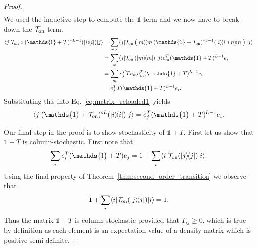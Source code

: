 \documentclass{article}
\newcommand{\on}{\rm on}
\newcommand{\ket}[1]{|#1\rangle}
\newcommand{\bra}[1]{\langle #1|}
\newcommand{\ketbra}[2]{| #1\rangle\! \langle #2|}
\newcommand{\brackets}[1]{\left[ #1 \right]}
\DeclareMathOperator{\Tr}{Tr}
\newcommand{\trace}[1]{\Tr \brackets{ #1 }}
\newcommand{\identity}{\mathds{1}}
\begin{document}
\begin{proof}
\begin{align}
\end{align}
We used the inductive step to compute the $\identity$ term and we now have to break down the $\mathcal{T}_{\on}$ term. 
\begin{align}
    \bra{j} \mathcal{T}_{\on} \circ (\identity + \mathcal{T})^{\circ L - 1} (\ketbra{i}{i}) \ket{j} &= \sum_{m, n} \bra{j} \mathcal{T}_{\on}\left( \ketbra{m}{m} (\identity + \mathcal{T}_{\on})^{\circ L - 1} (\ketbra{i}{i}) \ketbra{n}{n} \right) \ket{j} \\
    &= \sum_{m} \bra{j} \mathcal{T}_{\on} \left( \ketbra{m}{m} \right) \ket{j} e_m^T (\identity + T)^{L - 1} e_i \\
    &= \sum_m e_j^T T e_m e_m^T (\identity + T)^{L -1} e_i \\
    &= e_j^T T(\identity + T)^{L-1} e_i.
\end{align}
Substituting this into Eq. \eqref{eq:matrix_reloaded1} yields \begin{equation}
     \bra{j} (\identity + \mathcal{T}_{\on})^{\circ L}(\ketbra{i}{i}) \ket{j} = e_j^T (\identity + T)^{L-1} e_i.
\end{equation} 

Our final step in the proof is to show stochasticity of $\identity + T$.  First let us show that $\identity + T$ is column-stochastic.  First note that
\begin{equation}
    \sum_i e_i^T (\identity+ T) e_j = 1 + \sum_i \bra{i} \mathcal{T}_{\on}(\ketbra{j}{j}) \ket{i}.
\end{equation}
Using the final property of Theorem~\ref{thm:second_order_transition} we observe that
\begin{equation}
    1 + \sum_i \bra{i} \mathcal{T}_{\on}(\ketbra{j}{j}) \ket{i} = 1.
\end{equation}
Thus the matrix $\identity + T$ is column stochastic provided that $T_{ij} \ge 0$, which is true by definition as each element is an expectation value of a density matrix which is positive semi-definite.
\end{proof}
\end{document}
